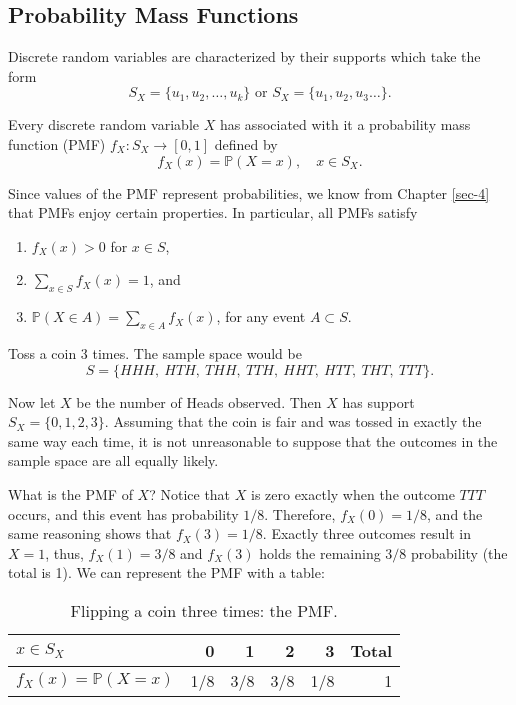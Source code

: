\subsection{Probability Mass Functions}
\label{sec-5-1-1}

Discrete random variables are characterized by their supports which
take the form
\begin{equation}
S_{X}=\{u_{1},u_{2},\ldots,u_{k}\}\mbox{ or }S_{X}=\{u_{1},u_{2},u_{3}\ldots\}.
\end{equation}

Every discrete random variable \(X\) has associated with it a
probability mass function (PMF) \(f_{X}:S_{X}\to[0,1]\) defined by
\begin{equation}
f_{X}(x)=\mathbb{P}(X=x),\quad x\in S_{X}.
\end{equation}

Since values of the PMF represent probabilities, we know from Chapter
\ref{sec-4} that PMFs enjoy certain properties. In particular, all
PMFs satisfy
\begin{enumerate}
\item \(f_{X}(x)>0\) for \(x\in S\),
\item \(\sum_{x\in S}f_{X}(x)=1\), and
\item \(\mathbb{P}(X\in A)=\sum_{x\in A}f_{X}(x)\), for any event
\(A\subset S\).
\end{enumerate}

\label{exa-Toss-a-coin} Toss a coin 3 times. The sample space would be \[
S=\{ HHH,\ HTH,\ THH,\ TTH,\ HHT,\ HTT,\ THT,\ TTT\}.  \]

Now let \(X\) be the number of Heads observed. Then \(X\) has support
\(S_{X}=\{ 0,1,2,3\} \). Assuming that the coin is fair and was tossed
in exactly the same way each time, it is not unreasonable to suppose
that the outcomes in the sample space are all equally likely.

What is the PMF of \(X\)? Notice that \(X\) is zero exactly when the
outcome \(TTT\) occurs, and this event has probability
\(1/8\). Therefore, \(f_{X}(0)=1/8\), and the same reasoning shows
that \(f_{X}(3)=1/8\). Exactly three outcomes result in \(X=1\), thus,
\(f_{X}(1)=3/8\) and \(f_{X}(3)\) holds the remaining \(3/8\)
probability (the total is 1). We can represent the PMF with a table:

\begin{table}[htb]
\caption[Flipping a coin three times]{\label{tab-pmf-flip-coin-three}Flipping a coin three times: the PMF.}
\centering
\begin{tabular}{lrrrrr}
\(x\in S_{X}\) & 0 & 1 & 2 & 3 & Total\\
\hline
\(f_{X}(x)=\mathbb{P}(X=x)\) & 1/8 & 3/8 & 3/8 & 1/8 & 1\\
\end{tabular}
\end{table}

